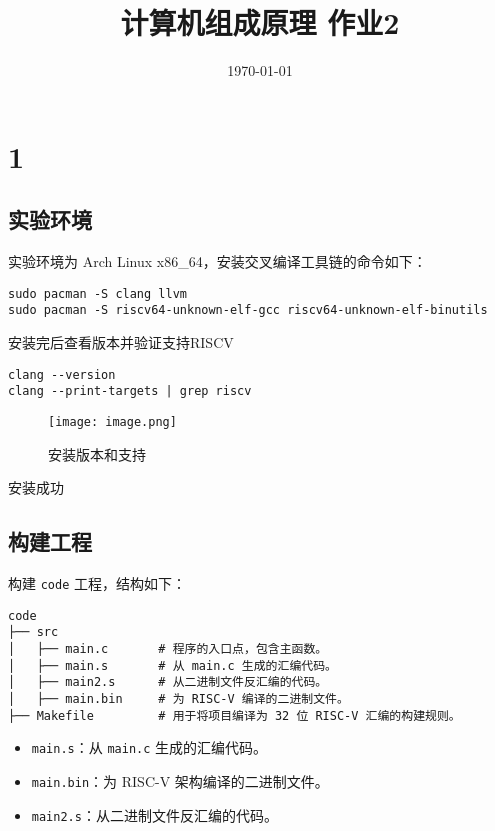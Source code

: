 \documentclass{ctexart}
\begin{document}
\title{计算机组成原理 作业2}

\date{\today}
\maketitle
\section*{1}
\subsection*{实验环境}
实验环境为 Arch Linux x86\_64，安装交叉编译工具链的命令如下：

\begin{verbatim}
sudo pacman -S clang llvm
sudo pacman -S riscv64-unknown-elf-gcc riscv64-unknown-elf-binutils
\end{verbatim}


安装完后查看版本并验证支持RISCV

\begin{verbatim}
clang --version
clang --print-targets | grep riscv
\end{verbatim}

\begin{figure}[H]
    \centering
    \texttt{[image: image.png]} %
    \caption{安装版本和支持}
    \label{fig:安装版本和支持} 
\end{figure}

安装成功
\subsection*{构建工程}
构建 \texttt{code} 工程，结构如下：
\begin{verbatim}
code
├── src
│   ├── main.c       # 程序的入口点，包含主函数。
│   ├── main.s       # 从 main.c 生成的汇编代码。
│   ├── main2.s      # 从二进制文件反汇编的代码。
│   ├── main.bin     # 为 RISC-V 编译的二进制文件。
├── Makefile         # 用于将项目编译为 32 位 RISC-V 汇编的构建规则。
\end{verbatim}

\begin{itemize}
    \item \texttt{main.s}：从 \texttt{main.c} 生成的汇编代码。
    \item \texttt{main.bin}：为 RISC-V 架构编译的二进制文件。
    \item \texttt{main2.s}：从二进制文件反汇编的代码。
\end{itemize}
\end{document}
